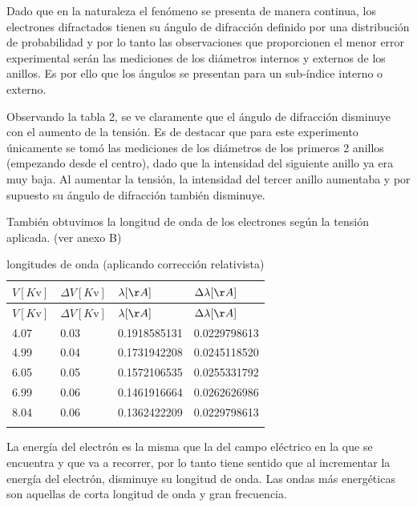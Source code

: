 \documentclass[]{article}
\begin{document}
Dado que en la naturaleza el fenómeno se presenta de manera continua,
los electrones difractados tienen su ángulo de difracción definido por
una distribución de probabilidad y por lo tanto las observaciones que
proporcionen el menor error experimental serán las mediciones de los
diámetros internos y externos de los anillos. Es por ello que los
ángulos se presentan para un sub-índice interno o externo.

Observando la tabla 2, se ve claramente que el ángulo de difracción
disminuye con el aumento de la tensión. Es de destacar que para este
experimento únicamente se tomó las mediciones de los diámetros de los
primeros 2 anillos (empezando desde el centro), dado que la intensidad
del siguiente anillo ya era muy baja. Al aumentar la tensión, la
intensidad del tercer anillo aumentaba y por supuesto su ángulo de
difracción también disminuye.

También obtuvimos la longitud de onda de los electrones según la tensión
aplicada. (ver anexo B)

\begin{longtable}[]{@{}llll@{}}
\toprule
\(V[K\mathrm{v}]\) & \(\Delta V [K\mathrm{v}]\) & \(\lambda [\AA]\) &
\(\Delta \lambda [\AA]\)\tabularnewline
\midrule
\endfirsthead
\toprule
\(V[K\mathrm{v}]\) & \(\Delta V [K\mathrm{v}]\) & \(\lambda [\AA]\) &
\(\Delta \lambda [\AA]\)\tabularnewline
\midrule
\endhead
4.07 & 0.03 & 0.1918585131 & 0.0229798613 \tabularnewline
4.99 & 0.04 & 0.1731942208 & 0.0245118520 \tabularnewline
6.05 & 0.05 & 0.1572106535 & 0.0255331792 \tabularnewline
6.99 & 0.06 & 0.1461916664 & 0.0262626986 \tabularnewline
8.04 & 0.06 & 0.1362422209 & 0.0229798613 \tabularnewline
\bottomrule
\caption{longitudes de onda (aplicando corrección
relativista)}\tabularnewline
\end{longtable}

La energía del electrón es la misma que la del campo eléctrico en la que
se encuentra y que va a recorrer, por lo tanto tiene sentido que al
incrementar la energía del electrón, disminuye su longitud de onda. Las
ondas más energéticas son aquellas de corta longitud de onda y gran
frecuencia.
\end{document}
